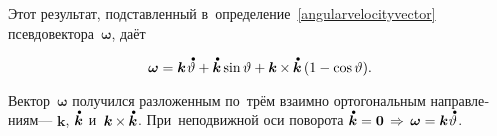 \begin{otherlanguage}{russian}
Этот результат, подставленный в~определение~\eqref{angularvelocityvector} псевдо\-вектора~$\bm{\omega}$, даёт

\nopagebreak\vspace{-0.5em}\begin{equation}
\bm{\omega} = \bm{k} \hspace{.2ex} \mathdotabove{\vartheta}
+ \mathdotabove{\bm{k}} \sine \vartheta
+ \bm{k} \hspace{-0.1ex}\times\hspace{-0.1ex} \mathdotabove{\bm{k}} \left( 1 - \cosine \vartheta \right) \hspace{-0.4ex}.
\end{equation}

\vspace{-0.3em}\noindent
Вектор~$\bm{\omega}$ получился разложенным по~трём взаимно ортогональным направлениям\:--- $\bm{k}$, $\mathdotabove{\bm{k}}$ и~${\bm{k} \hspace{-0.1ex}\times\hspace{-0.1ex} \mathdotabove{\bm{k}}}$. При~неподвижной оси поворота ${\mathdotabove{\bm{k}} = \zerovector \,\Rightarrow\, \bm{\omega} = \bm{k} \hspace{.1ex} \mathdotabove{\vartheta}}$.


\end{otherlanguage}
